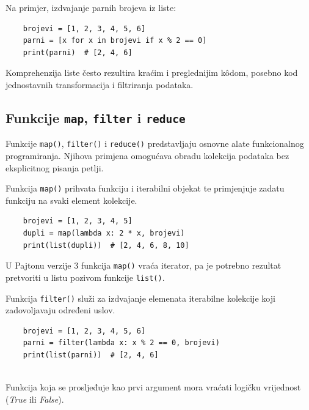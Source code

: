 Na primjer, izdvajanje parnih brojeva iz liste:

\begin{verbatim}
	brojevi = [1, 2, 3, 4, 5, 6]
	parni = [x for x in brojevi if x % 2 == 0]
	print(parni)  # [2, 4, 6]
\end{verbatim}

Komprehenzija liste često rezultira kraćim i preglednijim k\^odom, posebno kod jednostavnih transformacija i filtriranja podataka.

\subsection{Funkcije \texttt{map}, \texttt{filter} i \texttt{reduce}}

Funkcije \texttt{map()}, \texttt{filter()} i \texttt{reduce()} predstavljaju osnovne alate funkcionalnog programiranja. Njihova primjena omogućava obradu kolekcija podataka bez eksplicitnog pisanja petlji.


Funkcija \texttt{map()} prihvata funkciju i iterabilni objekat te primjenjuje zadatu funkciju na svaki element kolekcije.

\begin{verbatim}
	brojevi = [1, 2, 3, 4, 5]
	dupli = map(lambda x: 2 * x, brojevi)
	print(list(dupli)) 	# [2, 4, 6, 8, 10]
\end{verbatim}

U Pajtonu verzije 3 funkcija \texttt{map()} vraća iterator, pa je potrebno rezultat pretvoriti u listu pozivom funkcije \texttt{list()}.


Funkcija \texttt{filter()} služi za izdvajanje elemenata iterabilne kolekcije koji zadovoljavaju određeni uslov.

\begin{verbatim}
	brojevi = [1, 2, 3, 4, 5, 6]	
	parni = filter(lambda x: x % 2 == 0, brojevi)
	print(list(parni))  # [2, 4, 6]
	
\end{verbatim}

Funkcija koja se prosljeđuje kao prvi argument mora vraćati logičku vrijednost (\textit{True} ili \textit{False}).


